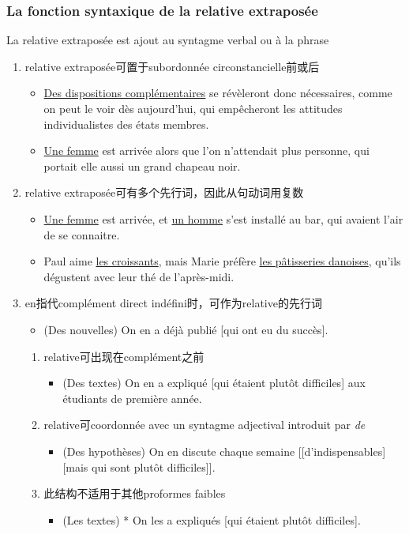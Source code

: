 \documentclass[UTF8]{report}
\begin{document}
\subsubsection{La fonction syntaxique de la relative extraposée}
La relative extraposée est ajout au syntagme verbal ou à la phrase
\begin{enumerate}
    \item relative extraposée可置于subordonnée circonstancielle前或后
    \begin{itemize}
        \item \underline{Des dispositions complémentaires} se révèleront donc nécessaires, comme on peut le voir dès aujourd’hui, qui empêcheront les attitudes individualistes des états membres.
        \item \underline{Une femme} est arrivée alors que l’on n’attendait plus personne, qui portait elle aussi un grand chapeau noir.
    \end{itemize}
    \item relative extraposée可有多个先行词，因此从句动词用复数
    \begin{itemize}
        \item \underline{Une femme} est arrivée, et \underline{un homme} s’est installé au bar, qui avaient l’air de se connaitre.
        \item Paul aime \underline{les croissants}, mais Marie préfère \underline{les pâtisseries danoises}, qu’ils dégustent avec leur thé de l’après-midi.
    \end{itemize}
    \item en指代complément direct indéfini时，可作为relative的先行词
    \begin{itemize}
        \item (Des nouvelles) On en a déjà publié [qui ont eu du succès].
    \end{itemize}
    \begin{enumerate}
        \item relative可出现在complément之前
        \begin{itemize}
            \item (Des textes) On en a expliqué [qui étaient plutôt difficiles] aux étudiants de première année.
        \end{itemize}
        \item relative可coordonnée avec un syntagme adjectival introduit par \textit{de}
        \begin{itemize}
            \item (Des hypothèses) On en discute chaque semaine [[d’indispensables] [mais qui sont plutôt difficiles]].
        \end{itemize}
        \item 此结构不适用于其他proformes faibles
        \begin{itemize}
            \item (Les textes) * On les a expliqués [qui étaient plutôt difficiles].
        \end{itemize}
    \end{enumerate}
\end{enumerate}
\end{document}
